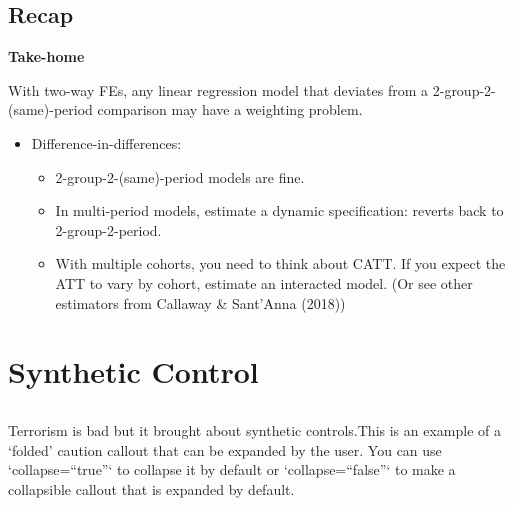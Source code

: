 \documentclass[
  letterpaper,
  DIV=11,
  numbers=noendperiod]{scrreprt}
\providecommand{\tightlist}{%
  \setlength{\itemsep}{0pt}\setlength{\parskip}{0pt}}\usepackage{longtable,booktabs,array}
\theoremstyle{definition}
\theoremstyle{remark}
\begin{document}
\section{Recap}\label{recap}

\textbf{Take-home}

With two-way FEs, any linear regression model that deviates from a
2-group-2-(same)-period comparison may have a weighting problem.

\begin{itemize}
\tightlist
\item
  Difference-in-differences:

  \begin{itemize}
  \tightlist
  \item
    2-group-2-(same)-period models are fine.
  \item
    In multi-period models, estimate a dynamic specification: reverts
    back to 2-group-2-period.
  \item
    With multiple cohorts, you need to think about CATT. If you expect
    the ATT to vary by cohort, estimate an interacted model. (Or see
    other estimators from Callaway \& Sant'Anna (2018))
  \end{itemize}
\end{itemize}

\chapter*{Synthetic Control}\label{synthetic-control}


\section*{}\label{section}

\markright{}

\begin{tcolorbox}[enhanced jigsaw, bottomrule=.15mm, coltitle=black, arc=.35mm, left=2mm, opacityback=0, leftrule=.75mm, colbacktitle=quarto-callout-caution-color!10!white, title=\textcolor{quarto-callout-caution-color}{\faFire}\hspace{0.5em}{Expand To Learn About Terrorism in Franco's era}, toprule=.15mm, bottomtitle=1mm, breakable, colframe=quarto-callout-caution-color-frame, opacitybacktitle=0.6, titlerule=0mm, colback=white, rightrule=.15mm, toptitle=1mm]

Terrorism is bad but it brought about synthetic controls.This is an
example of a `folded' caution callout that can be expanded by the user.
You can use `collapse=``true''` to collapse it by default or
`collapse=``false''` to make a collapsible callout that is expanded by
default.

\end{tcolorbox}
\end{document}
